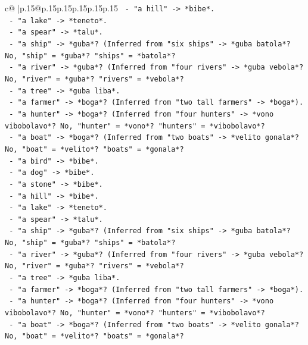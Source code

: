 \documentclass{article}
\begin{document}
{\begin{supertabular}{c@{$\;$}|p{.15\linewidth}@{}p{.15\linewidth}p{.15\linewidth}p{.15\linewidth}p{.15\linewidth}p{.15\linewidth}}
{{{\texttt{          {-} "a hill" {-}> *bibe*.} \\
\texttt{          {-} "a lake" {-}> *teneto*.} \\
\texttt{          {-} "a spear" {-}> *talu*.} \\
\texttt{          {-} "a ship" {-}> *guba*? (Inferred from "six ships" {-}> *guba batola*? No, "ship" = *guba*? "ships" = *batola*?} \\
\texttt{          {-} "a river" {-}> *guba*? (Inferred from "four rivers" {-}> *guba vebola*? No, "river" = *guba*? "rivers" = *vebola*?} \\
\texttt{          {-} "a tree" {-}> *guba liba*.} \\
\texttt{          {-} "a farmer" {-}> *boga*? (Inferred from "two tall farmers" {-}> *boga*).} \\
\texttt{          {-} "a hunter" {-}> *boga*? (Inferred from "four hunters" {-}> *vono vibobolavo*? No, "hunter" = *vono*? "hunters" = *vibobolavo*?} \\
\texttt{          {-} "a boat" {-}> *boga*? (Inferred from "two boats" {-}> *velito gonala*? No, "boat" = *velito*? "boats" = *gonala*?} \\
\texttt{          {-} "a bird" {-}> *bibe*.} \\
\texttt{          {-} "a dog" {-}> *bibe*.} \\
\texttt{          {-} "a stone" {-}> *bibe*.} \\
\texttt{          {-} "a hill" {-}> *bibe*.} \\
\texttt{          {-} "a lake" {-}> *teneto*.} \\
\texttt{          {-} "a spear" {-}> *talu*.} \\
\texttt{          {-} "a ship" {-}> *guba*? (Inferred from "six ships" {-}> *guba batola*? No, "ship" = *guba*? "ships" = *batola*?} \\
\texttt{          {-} "a river" {-}> *guba*? (Inferred from "four rivers" {-}> *guba vebola*? No, "river" = *guba*? "rivers" = *vebola*?} \\
\texttt{          {-} "a tree" {-}> *guba liba*.} \\
\texttt{          {-} "a farmer" {-}> *boga*? (Inferred from "two tall farmers" {-}> *boga*).} \\
\texttt{          {-} "a hunter" {-}> *boga*? (Inferred from "four hunters" {-}> *vono vibobolavo*? No, "hunter" = *vono*? "hunters" = *vibobolavo*?} \\
\texttt{          {-} "a boat" {-}> *boga*? (Inferred from "two boats" {-}> *velito gonala*? No, "boat" = *velito*? "boats" = *gonala*?} \\
}}}
\end{supertabular}}
\end{document}

